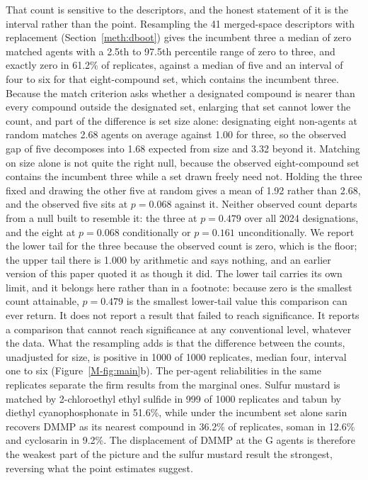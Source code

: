 \documentclass[11pt,a4paper]{article}
\begin{document}
That count is sensitive to the descriptors, and the honest statement of it is
the interval rather than the point. Resampling the 41 merged-space descriptors
with replacement (Section~\ref{meth:dboot}) gives the incumbent three a median
of zero matched agents with a 2.5th to 97.5th percentile range of zero to
three, and exactly zero
in 61.2\% of replicates, against a median of five and an interval of four to six
for that eight-compound set, which contains the incumbent three. Because the
match criterion asks whether a designated compound is nearer than every
compound outside the designated set, enlarging that set cannot lower the count,
and part of the difference is set size alone: designating eight non-agents at
random matches 2.68 agents on average against 1.00 for three, so the observed
gap of five decomposes into 1.68 expected from size and 3.32 beyond it. Matching
on size alone is not quite the right null, because the observed eight-compound
set contains the incumbent three while a set drawn freely need not. Holding the
three fixed and drawing the other five at random gives a mean of 1.92 rather
than 2.68, and the observed five sits at $p=0.068$ against it. Neither observed
count departs from a null built to resemble it: the three at $p=0.479$ over all
2024 designations, and the eight at $p=0.068$ conditionally or $p=0.161$
unconditionally. We report the lower tail for the three because the observed
count is zero, which is the floor; the upper tail there is 1.000 by arithmetic
and says nothing, and an earlier version of this paper quoted it as though it
did. The lower tail carries its own limit, and it belongs here rather than in a
footnote: because zero is the smallest count attainable, $p=0.479$ is the
smallest lower-tail value this comparison can ever return. It does not report a
result that failed to reach significance. It reports a comparison that cannot
reach significance at any conventional level, whatever the data. What the resampling adds is that the
difference between the counts, unadjusted for size, is positive in 1000 of 1000 replicates, median
four, interval one to six (Figure~\ref{M-fig:main}b). The per-agent reliabilities
in the same replicates separate the firm results from the marginal ones. Sulfur
mustard is matched by 2-chloroethyl ethyl sulfide in 999 of 1000 replicates and tabun by
diethyl cyanophosphonate in 51.6\%, while under the incumbent set alone sarin
recovers DMMP as its nearest compound in 36.2\% of replicates, soman in 12.6\%
and cyclosarin in 9.2\%. The displacement of DMMP at the G agents is therefore
the weakest part of the picture and the sulfur mustard result the strongest,
reversing what the point estimates suggest.
\end{document}
